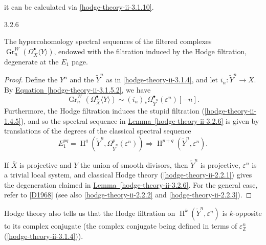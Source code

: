     it can be calculated via \cref{hodge-theory-ii-3.1.10}.\begin{lemma}{3.2.6}\label{hodge-theory-ii-3.2.6}\skipsinglepar\par{}The hypercohomology spectral sequences of the filtered complexes \(\operatorname {Gr}_n^W(\Omega _{\overline {X}}^\bullet \langle  Y\rangle )\), endowed with the filtration induced by the Hodge filtration, degenerate at the \(E_1\) page.\begin{proof}\par{}Define the \(Y^n\) and the \(\widetilde {Y}^n\) as in \cref{hodge-theory-ii-3.1.4}, and let \(i_n\colon \widetilde {Y}^n\to  X\).
      By \hyperref[hodge-theory-ii-3.1.5.2]{Equation~\ref*{hodge-theory-ii-3.1.5.2}}, we have
      \[         \operatorname {Gr}_n^W(\Omega _{\overline {X}}^\bullet \langle  Y\rangle )         \sim  (i_n)_*\Omega _{\widetilde {Y}^n}^\bullet (\varepsilon ^n)[-n].       \]
      Furthermore, the Hodge filtration induces the stupid filtration (\cref{hodge-theory-ii-1.4.5}), and so the spectral sequence in \hyperref[hodge-theory-ii-3.2.6]{Lemma~\ref*{hodge-theory-ii-3.2.6}} is given by translations of the degrees of the classical spectral sequence
      \[         E_1^{pq}         = \operatorname {H}^q(\widetilde {Y}^n,\Omega _{\widetilde {Y}^n}^p(\varepsilon ^n))         \Rightarrow  \operatorname {H}^{p+q}(\widetilde {Y}^n,\varepsilon ^n).       \]\par{}If \(\overline {X}\) is projective and \(Y\) the union of smooth divisors, then \(\widetilde {Y}^n\) is projective, \(\varepsilon ^n\) is a trivial local system, and classical Hodge theory (\cref{hodge-theory-ii-2.2.1}) gives the degeneration claimed in \hyperref[hodge-theory-ii-3.2.6]{Lemma~\ref*{hodge-theory-ii-3.2.6}}.
      For the general case, refer to [\hyperref[D1968]{D1968}] (see also \cref{hodge-theory-ii-2.2.2} and \cref{hodge-theory-ii-2.2.3}).\end{proof}\end{lemma}\par{}Hodge theory also tells us that the Hodge filtration on \(\operatorname {H}^k(\widetilde {Y}^n,\varepsilon ^n)\) is \(k\)-opposite to its complex conjugate (the complex conjugate being defined in terms of \(\varepsilon _\mathbb {Z}^n\) (\cref{hodge-theory-ii-3.1.4})).
